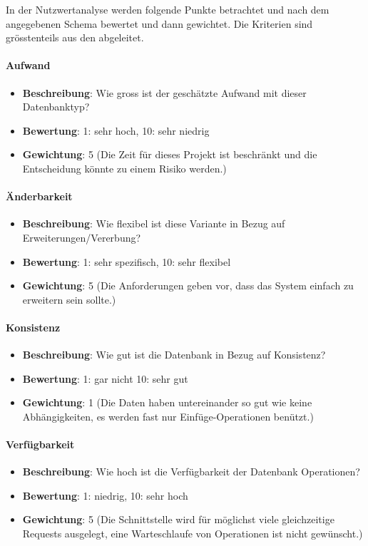 In der Nutzwertanalyse werden folgende Punkte betrachtet und nach dem angegebenen Schema bewertet und dann gewichtet. 
Die Kriterien sind grösstenteils aus den  abgeleitet.

\paragraph{Aufwand}
\begin{itemize}
	\item \textbf{Beschreibung}: Wie gross ist der geschätzte Aufwand mit dieser Datenbanktyp?
	\item \textbf{Bewertung}: 1: sehr hoch, 10: sehr niedrig
	\item \textbf{Gewichtung}: 5 (Die Zeit für dieses Projekt ist beschränkt und die Entscheidung könnte zu einem Risiko werden.)
\end{itemize}

\paragraph{Änderbarkeit}
\begin{itemize}
	\item \textbf{Beschreibung}: Wie flexibel ist diese Variante in Bezug auf Erweiterungen/Vererbung?
	\item \textbf{Bewertung}: 1: sehr spezifisch, 10: sehr flexibel
	\item \textbf{Gewichtung}: 5 (Die Anforderungen geben vor, dass das System einfach zu erweitern sein sollte.)
\end{itemize}

\paragraph{Konsistenz}
\begin{itemize}
	\item \textbf{Beschreibung}: Wie gut ist die Datenbank in Bezug auf Konsistenz?
	\item \textbf{Bewertung}: 1: gar nicht 10: sehr gut
	\item \textbf{Gewichtung}: 1 (Die Daten haben untereinander so gut wie keine Abhängigkeiten, es werden fast nur Einfüge-Operationen benützt.)
\end{itemize}

\paragraph{Verfügbarkeit}
\begin{itemize}
	\item \textbf{Beschreibung}: Wie hoch ist die Verfügbarkeit der Datenbank Operationen?
	\item \textbf{Bewertung}: 1: niedrig, 10: sehr hoch
	\item \textbf{Gewichtung}: 5 (Die Schnittstelle wird für möglichst viele gleichzeitige Requests ausgelegt, eine Warteschlaufe von Operationen ist nicht gewünscht.)
\end{itemize}


